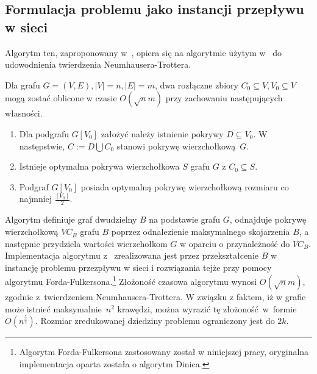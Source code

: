 \subsection{Formulacja problemu jako instancji przepływu w sieci}\label{Kernelization_network_flow}
Algorytm ten, zaproponowany w~\cite{KernelizationAlgorithms04}, opiera się na
algorytmie użytym w~\cite{Niedermeier02} do udowodnienia twierdzenia
Neumhausera-Trottera.

\begin{nt}
  Dla grafu $G=(V,E), |V|=n, |E|=m$, dwa rozłączne zbiory $C_0 \subseteq V,
  V_0 \subseteq V$ mogą zostać oblicone w czasie $O(\sqrt{n}m)$ przy zachowaniu
  następujących własności.
  \begin{enumerate}
    \item Dla podgrafu $G[V_0]$ założyć należy istnienie pokrywy $D \subseteq
      V_0$. W następstwie, $C := D \bigcup C_0$ stanowi pokrywę wierzchołkową~$G$.
    \item Istnieje optymalna pokrywa wierzchołkowa $S$ grafu $G$ z $C_0
      \subseteq S$.
    \item Podgraf $G[V_0]$ posiada optymalną pokrywę wierzchołkową rozmiaru co
      najmniej $\frac{[V_0]}{2}$. 
  \end{enumerate}
\end{nt}

Algorytm definiuje graf dwudzielny $B$ na podstawie grafu $G$, odnajduje pokrywę
wierzchołkową $VC_B$ grafu $B$ poprzez odnalezienie maksymalnego skojarzenia $B$,
a następnie przydziela wartości wierzchołkom $G$ w oparciu o przynależność do
$VC_B$.
Implementacja algorytmu z~\cite{Niedermeier02} zrealizowana jest przez
przekształcenie $B$ w instancję problemu przezpływu w sieci i rozwiązania tejże
przy pomocy algorytmu Forda-Fulkersona.\footnote{Algorytm Forda-Fulkersona
  zastosowany został w niniejszej pracy, oryginalna implementacja oparta została
o algorytm Dinica.}
Złożoność czasowa algorytmu wynosi $O(\sqrt{n}m)$, zgodnie z~twierdzeniem
Neumhausera-Trottera. 
W związku z faktem, iż w grafie może istnieć maksymalnie~$n^2$ krawędzi, można
wyrazić tę złożoność~w~formie $O(n^\frac{5}{2})$.
Rozmiar zredukowanej dziedziny problemu ograniczony jest do $2k$.

